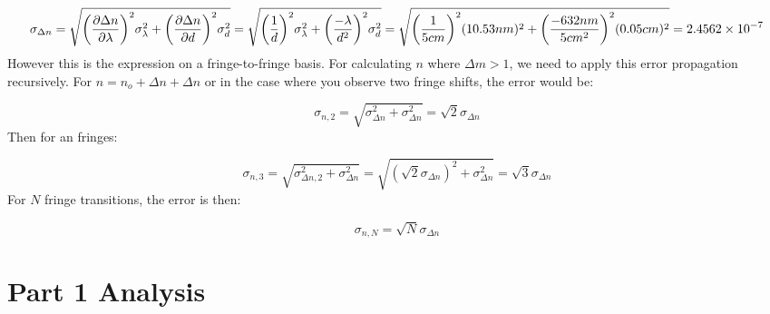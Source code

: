 \documentclass{article}
\begin{document}
\begin{equation}
	\sigma_{\Delta{n}} = \sqrt{ \bigg(  \frac{\partial\Delta{n}}{\partial\lambda} \bigg)^2\sigma_\lambda^2 + \bigg( \frac{\partial\Delta{n}}{\partial{d}}  \bigg)^2\sigma_d^2} = \sqrt{ \bigg(  \frac{1}{d} \bigg)^2\sigma_\lambda^2 + \bigg( \frac{-\lambda}{d^2}  \bigg)^2\sigma_d^2}
    = \sqrt{ \bigg(  \frac{1}{5cm} \bigg)^2(10.53nm)^2 + \bigg( \frac{-632nm}{5cm^2}  \bigg)^2(0.05cm)^2} = \num{2.4562d-7}
\end{equation}
However this is the expression on a fringe-to-fringe basis. For calculating $n$ where $\Delta{m} > 1$, we need to apply this error propagation recursively.
For $n = n_o + \Delta{n} + \Delta{n}$ or in the case where you observe two fringe shifts, the error would be:

\begin{equation}
	\sigma_{n,2} = \sqrt{\sigma_{\Delta{n}}^2 + \sigma_{\Delta{n}}^2} = \sqrt{2}\sigma_{\Delta{n}}
\end{equation}Then for an fringes:

\begin{equation}
	\sigma_{n,3} = \sqrt{\sigma_{\Delta{n,2}}^2 + \sigma_{\Delta{n}}^2} =\sqrt{(\sqrt{2}\sigma_{\Delta{n}})^2 + \sigma_{\Delta{n}}^2} = \sqrt{3}\sigma_{\Delta{n}}
\end{equation}For $N$ fringe transitions, the error is then:

\begin{equation}
  \sigma_{n,N} = \sqrt{N}\sigma_{\Delta{n}}
\end{equation}





\clearpage

\section{ Part 1 Analysis }\label{sec:part_1_analysis}












\end{document}
